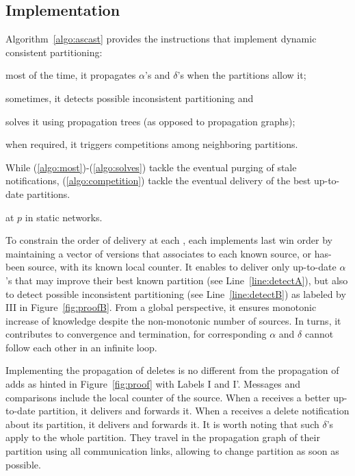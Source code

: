 

\subsection{Implementation}

Algorithm~\ref{algo:ascast} provides the instructions that
implement dynamic consistent partitioning:
\begin{inparaenum}[(i)]
\item \label{algo:most} most of the time, it propagates $\alpha$'s and
  $\delta$'s when the partitions allow it;
\item \label{algo:sometimes} sometimes, it detects possible
  inconsistent partitioning and
\item \label{algo:solves}solves it using propagation trees (as opposed
  to propagation graphs);
\item \label{algo:competition} when required, it triggers competitions
  among neighboring partitions.
\end{inparaenum}
While (\ref{algo:most})-(\ref{algo:solves}) tackle the eventual purging of
stale notifications, (\ref{algo:competition}) tackle the eventual
delivery of the best up-to-date partitions.

\begin{algorithm}
  
  \caption{\label{algo:ascast}\NAME at \Process $p$ in static networks.}
\end{algorithm}

To constrain the order of delivery at each \process, each \process
implements last win order by maintaining a vector of versions that
associates to each known source, or has-been source, with its known
local counter. It enables \processes to deliver only up-to-date
$\alpha$'s that may improve their best known partition (see
Line~\ref{line:detectA}), but also to detect possible inconsistent
partitioning (see Line~\ref{line:detectB}) as labeled by III in
Figure~\ref{fig:proofB}. From a global perspective, it ensures
monotonic increase of knowledge despite the non-monotonic number of
sources. In turns, it contributes to convergence and termination, for
corresponding $\alpha$ and $\delta$ cannot follow each other in an
infinite loop.

Implementing the propagation of deletes is no different from the
propagation of adds as hinted in Figure~\ref{fig:proof} with Labels I
and I'. Messages and comparisons include the local counter of the
source. When a \process receives a better up-to-date partition, it
delivers and forwards it. When a \process receives a delete
notification about its partition, it delivers and forwards it. It is
worth noting that such $\delta$'s apply to the whole partition. They
travel in the propagation graph of their partition using all
communication links, allowing \processes to change partition as soon as
possible.

